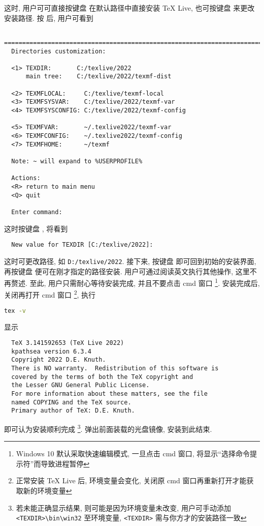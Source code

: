 这时, 用户可可直接按键盘  在默认路径中直接安装 \TeX{} Live,
也可按键盘  来更改安装路径.
按  后, 用户可看到
\begin{lstlisting}
  ==============================================================================
  Directories customization:
  
  <1> TEXDIR:       C:/texlive/2022
      main tree:    C:/texlive/2022/texmf-dist
  
  <2> TEXMFLOCAL:     C:/texlive/texmf-local
  <3> TEXMFSYSVAR:    C:/texlive/2022/texmf-var
  <4> TEXMFSYSCONFIG: C:/texlive/2022/texmf-config
  
  <5> TEXMFVAR:       ~/.texlive2022/texmf-var
  <6> TEXMFCONFIG:    ~/.texlive2022/texmf-config
  <7> TEXMFHOME:      ~/texmf
  
  Note: ~ will expand to %USERPROFILE%
  
  Actions:
  <R> return to main menu
  <Q> quit
  
  Enter command:
\end{lstlisting}
这时按键盘 , 将看到
\begin{lstlisting}
  New value for TEXDIR [C:/texlive/2022]:
\end{lstlisting}
这时可更改路径, 如 \texttt{D:/texlive/2022}.
接下来, 按键盘  即可回到初始的安装界面,
再按键盘  便可在刚才指定的路径安装.
用户可通过阅读英文执行其他操作, 这里不再赘述. 
至此, 用户只需耐心等待安装完成, 并且不要点击 \textsf{cmd} 窗口%
\footnote{Windows 10 默认采取快速编辑模式, 一旦点击 \textsf{cmd} 窗口,
将显示``选择命令提示符''而导致进程暂停}. 
安装完成后, 关闭再打开 \textsf{cmd} 窗口%
\footnote{正常安装 \TeX{} Live 后, 环境变量会变化,
关闭原 \textsf{cmd} 窗口再重新打开才能获取新的环境变量},
执行
\begin{lstlisting}[language = bash]
  tex -v
\end{lstlisting}
显示
\begin{lstlisting}
  TeX 3.141592653 (TeX Live 2022)
  kpathsea version 6.3.4
  Copyright 2022 D.E. Knuth.
  There is NO warranty.  Redistribution of this software is
  covered by the terms of both the TeX copyright and
  the Lesser GNU General Public License.
  For more information about these matters, see the file
  named COPYING and the TeX source.
  Primary author of TeX: D.E. Knuth.
\end{lstlisting}
即可认为安装顺利完成%
\footnote{若未能正确显示结果, 则可能是因为环境变量未改变,
用户可手动添加 \texttt{<TEXDIR>\textbackslash bin\textbackslash win32} 至环境变量,
\texttt{<TEXDIR>} 需与你方才的安装路径一致}.
弹出前面装载的光盘镜像,
安装到此结束.

